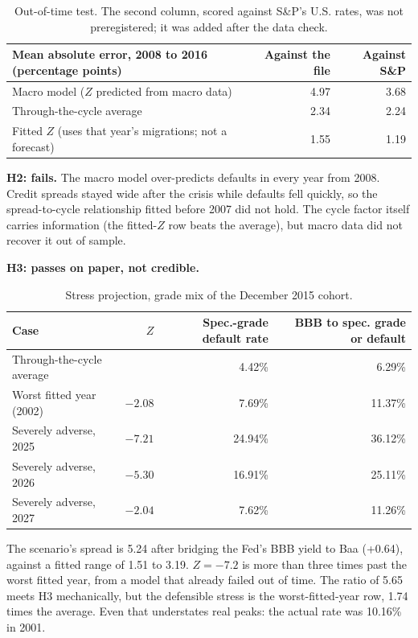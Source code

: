 \documentclass[11pt]{article}
\begin{document}
\begin{table}[h]
\centering\small
\begin{tabular}{lrr}
\toprule
Mean absolute error, 2008 to 2016 (percentage points) & Against the file & Against S\&P \\
\midrule
Macro model ($Z$ predicted from macro data) & 4.97 & 3.68 \\
Through-the-cycle average & 2.34 & 2.24 \\
Fitted $Z$ (uses that year's migrations; not a forecast) & 1.55 & 1.19 \\
\bottomrule
\end{tabular}
\caption{Out-of-time test. The second column, scored against S\&P's U.S. rates, was not preregistered; it was added after the data check.}
\end{table}

\textbf{H2: fails.} The macro model over-predicts defaults in every year from 2008. Credit spreads stayed wide after the crisis while defaults fell quickly, so the spread-to-cycle relationship fitted before 2007 did not hold. The cycle factor itself carries information (the fitted-$Z$ row beats the average), but macro data did not recover it out of sample.

\textbf{H3: passes on paper, not credible.}

\begin{table}[h]
\centering\small
\begin{tabular}{lrrr}
\toprule
Case & $Z$ & Spec.-grade default rate & BBB to spec. grade or default \\
\midrule
Through-the-cycle average & & 4.42\% & 6.29\% \\
Worst fitted year (2002) & $-2.08$ & 7.69\% & 11.37\% \\
Severely adverse, 2025 & $-7.21$ & 24.94\% & 36.12\% \\
Severely adverse, 2026 & $-5.30$ & 16.91\% & 25.11\% \\
Severely adverse, 2027 & $-2.04$ & 7.62\% & 11.26\% \\
\bottomrule
\end{tabular}
\caption{Stress projection, grade mix of the December 2015 cohort.}
\end{table}

The scenario's spread is 5.24 after bridging the Fed's BBB yield to Baa (+0.64), against a fitted range of 1.51 to 3.19. $Z = -7.2$ is more than three times past the worst fitted year, from a model that already failed out of time. The ratio of 5.65 meets H3 mechanically, but the defensible stress is the worst-fitted-year row, 1.74 times the average. Even that understates real peaks: the actual rate was 10.16\% in 2001.
\end{document}
